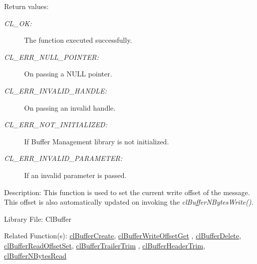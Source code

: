 \begin{Desc}
\item[Return values:]
\begin{description}
\item[{\em CL\_\-OK:}]The function executed successfully. \item[{\em CL\_\-ERR\_\-NULL\_\-POINTER:}]On passing a NULL pointer. \item[{\em CL\_\-ERR\_\-INVALID\_\-HANDLE:}]On passing an invalid handle. \item[{\em CL\_\-ERR\_\-NOT\_\-INITIALIZED:}]If Buffer Management library is not initialized. \item[{\em CL\_\-ERR\_\-INVALID\_\-PARAMETER:}]If an invalid parameter is passed.\end{description}
\end{Desc}
\begin{Desc}
\item[Description:]This function is used to set the current write offset of the message. This offset is also automatically updated on invoking the
\textit{clBufferNBytesWrite()}.\end{Desc}
\begin{Desc}
\item[Library File:]Cl\-Buffer\end{Desc}
\begin{Desc}
\item[Related Function(s):]\hyperlink{pagebuf103}{cl\-Buffer\-Create}, \hyperlink{pagebuf118}{cl\-Buffer\-Write\-Offset\-Get} ,
\hyperlink{pagebuf105}{cl\-Buffer\-Delete}, \hyperlink{pagebuf120}{cl\-Buffer\-Read\-Offset\-Set}, 
\hyperlink{pagebuf125}{cl\-Buffer\-Trailer\-Trim} , \hyperlink{pagebuf124}{cl\-Buffer\-Header\-Trim}, 
\hyperlink{pagebuf108}{cl\-Buffer\-NBytes\-Read} \end{Desc}
\newpage



